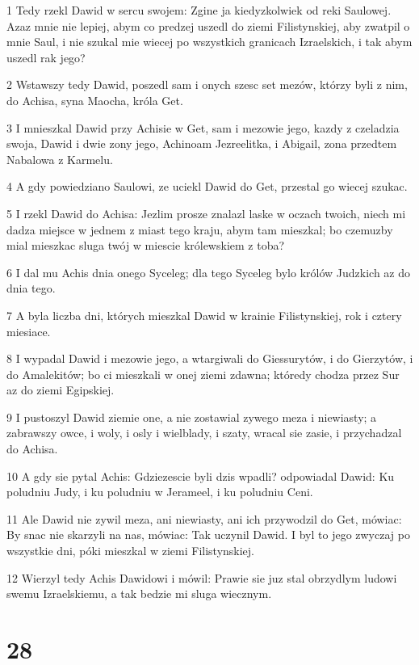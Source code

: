 \par 1 Tedy rzekl Dawid w sercu swojem: Zgine ja kiedyzkolwiek od reki Saulowej. Azaz mnie nie lepiej, abym co predzej uszedl do ziemi Filistynskiej, aby zwatpil o mnie Saul, i nie szukal mie wiecej po wszystkich granicach Izraelskich, i tak abym uszedl rak jego?
\par 2 Wstawszy tedy Dawid, poszedl sam i onych szesc set mezów, którzy byli z nim, do Achisa, syna Maocha, króla Get.
\par 3 I mnieszkal Dawid przy Achisie w Get, sam i mezowie jego, kazdy z czeladzia swoja, Dawid i dwie zony jego, Achinoam Jezreelitka, i Abigail, zona przedtem Nabalowa z Karmelu.
\par 4 A gdy powiedziano Saulowi, ze uciekl Dawid do Get, przestal go wiecej szukac.
\par 5 I rzekl Dawid do Achisa: Jezlim prosze znalazl laske w oczach twoich, niech mi dadza miejsce w jednem z miast tego kraju, abym tam mieszkal; bo czemuzby mial mieszkac sluga twój w miescie królewskiem z toba?
\par 6 I dal mu Achis dnia onego Syceleg; dla tego Syceleg bylo królów Judzkich az do dnia tego.
\par 7 A byla liczba dni, których mieszkal Dawid w krainie Filistynskiej, rok i cztery miesiace.
\par 8 I wypadal Dawid i mezowie jego, a wtargiwali do Giessurytów, i do Gierzytów, i do Amalekitów; bo ci mieszkali w onej ziemi zdawna; któredy chodza przez Sur az do ziemi Egipskiej.
\par 9 I pustoszyl Dawid ziemie one, a nie zostawial zywego meza i niewiasty; a zabrawszy owce, i woly, i osly i wielblady, i szaty, wracal sie zasie, i przychadzal do Achisa.
\par 10 A gdy sie pytal Achis: Gdziezescie byli dzis wpadli? odpowiadal Dawid: Ku poludniu Judy, i ku poludniu w Jerameel, i ku poludniu Ceni.
\par 11 Ale Dawid nie zywil meza, ani niewiasty, ani ich przywodzil do Get, mówiac: By snac nie skarzyli na nas, mówiac: Tak uczynil Dawid. I byl to jego zwyczaj po wszystkie dni, póki mieszkal w ziemi Filistynskiej.
\par 12 Wierzyl tedy Achis Dawidowi i mówil: Prawie sie juz stal obrzydlym ludowi swemu Izraelskiemu, a tak bedzie mi sluga wiecznym.

\chapter{28}

